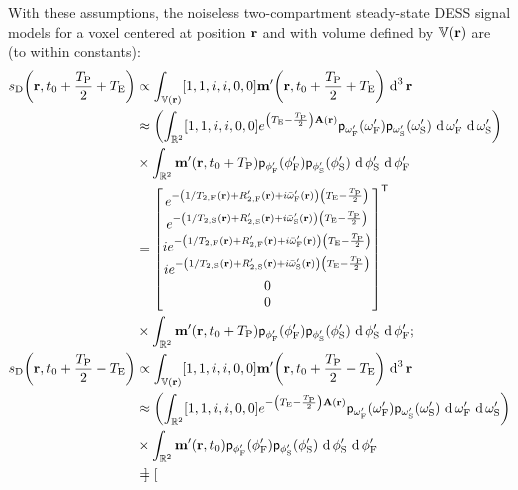 With these assumptions,
the noiseless two-compartment steady-state DESS signal models
for a voxel centered
at position $\mathbf{r}$
and with volume defined
by $\setV\pr$ are (to within constants):
\begin{align}
	\dess\paren{\bmr,t_0+\frac{\TP}{2}+\TE} 
		&\propto \int_{\setV\paren{\bmr}}
			\brac{1, 1, i, i, 0, 0} \bmmp\paren{\bmr,t_0+\frac{\TP}{2}+\TE} \dercubed{\bmr}
			\label{eq:mwf,dess-def,int} \\
		&\approx \paren{\int_{\reals{2}} 
			\brac{1, 1, i, i, 0, 0} e^{\paren{\TE-\frac{\TP}{2}}\bmA\pr}
				\dist{\ompf}\paren{\ompf} \dist{\omps}\paren{\omps} 
				\der{\ompf} \der{\omps}}
				\nonumber \\
		&\times \int_{\reals{2}} \bmmp\paren{\bmr,t_0+\TP}
			\dist{\phipf} \paren{\phipf} \dist{\phips} \paren{\phips} 
			\der{\phips} \der{\phipf}
			\label{eq:mwf,dess-def,int-freq} \\
		&= 
			\begin{bmatrix}
				e^{-\paren{1/\tf{2}\pr+\Rtpf\pr+i\ompfmed\pr}\paren{\TE-\frac{\TP}{2}}} \\
				e^{-\paren{1/\ts{2}\pr+\Rtps\pr+i\ompsmed\pr}\paren{\TE-\frac{\TP}{2}}} \\
				ie^{-\paren{1/\tf{2}\pr+\Rtpf\pr+i\ompfmed\pr}\paren{\TE-\frac{\TP}{2}}} \\
				ie^{-\paren{1/\ts{2}\pr+\Rtps\pr+i\ompsmed\pr}\paren{\TE-\frac{\TP}{2}}} \\
				0 \\
				0
			\end{bmatrix}\tpose 
			\nonumber \\
		&\times \int_{\reals{2}} \bmmp\paren{\bmr,t_0+\TP}
			\dist{\phipf} \paren{\phipf} \dist{\phips} \paren{\phips} 
			\der{\phips} \der{\phipf};
			\label{eq:mwf,dess-def,int-exchg0} \\
	\dess\paren{\bmr,t_0+\frac{\TP}{2}-\TE}
		&\propto \int_{\setV\paren{\bmr}}
			\brac{1, 1, i, i, 0, 0} \bmmp\paren{\bmr,t_0+\frac{\TP}{2}-\TE} \dercubed{\bmr}
			\label{eq:mwf,dess-ref,int} \\
		&\approx \paren{\int_{\reals{2}} 
			\brac{1, 1, i, i, 0, 0} e^{-\paren{\TE-\frac{\TP}{2}}\bmA\pr}
				\dist{\ompf}\paren{\ompf} \dist{\omps}\paren{\omps} 
				\der{\ompf} \der{\omps}}
				\nonumber \\
		&\times \int_{\reals{2}} \bmmp\paren{\bmr,t_0}
			\dist{\phipf} \paren{\phipf} \dist{\phips} \paren{\phips} 
			\der{\phips} \der{\phipf}
			\label{eq:mwf,dess-ref,int-freq} \\
		&= 
			\begin{bmatrix}

\end{bmatrix}
\end{align}
